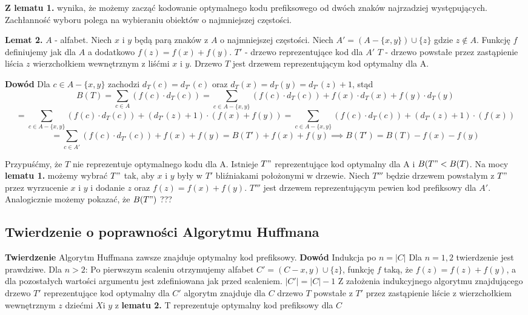 \textbf{Z lematu 1.} wynika, że możemy zacząć kodowanie optymalnego kodu prefiksowego od dwóch znaków najrzadziej występujących. Zachłanność wyboru polega na wybieraniu obiektów o najmniejszej częstości.

\textbf{Lemat 2.} $A$ - alfabet. Niech $x$ i $y$ będą parą znaków z $A$ o  najmniejszej częstości. Niech $A'= (A - \{x,y\}) \cup \{z\}$ gdzie $z \not\in A$. Funkcję $f$ definiujemy jak dla $A$ a dodatkowo $f(z) = f(x) + f(y)$.
$T'$ - drzewo reprezentujące kod dla $A'$
$T$ - drzewo powstałe przez zastąpienie liścia $z$ wierzchołkiem wewnętrznym z liśćmi $x$ i $y$.
Drzewo $T$ jest drzewem reprezentującym kod optymalny dla A.

\textbf{Dowód} Dla $c \in A - \{x,y\}$ zachodzi $d_T(c) = d_{T'}(c)$ oraz $d_T(x) = d_T(y) = d_{T'}(z)+1$, stąd 
$$B(T) = \sum_{c \in A}(f(c) \cdot d_T(c)) = \sum_{c \in A-\{x,y\}}(f(c) \cdot d_T(c)) + f(x) \cdot d_T(x) + f(y) \cdot d_T(y)$$
$$ = \sum_{c \in A-\{x,y\}}(f(c) \cdot d_T(c)) + (d_{T'}(z) +1) \cdot (f(x) + f(y)) = \sum_{c \in A-\{x,y\}}(f(c) \cdot d_T(c)) + (d_{T'}(z) +1) \cdot (f(x))$$
$$ = \sum_{c \in A'}(f(c) \cdot d_{T'}(c)) + f(x) + f(y) = B(T') + f(x) + f(y) \implies B(T') = B(T) - f(x) - f(y)$$

Przypuśćmy, że $T$ nie reprezentuje optymalnego kodu dla A. Istnieje $T"$ reprezentujące kod optymalny dla A i $B(T"  < B(T)$. Na mocy \textbf{lematu 1.} możemy wybrać $T"$ tak, aby $x$ i $y$ były w $T'$ bliźniakami położonymi w drzewie. Niech $T'''$ będzie drzewem powstałym z $T"$ przez wyrzucenie $x$ i $y$ i dodanie $z$ oraz $f(z) = f(x) + f(y)$. $T'''$ jest drzewem reprezentującym pewien kod prefiksowy dla $A'$. Analogicznie możemy pokazać, że $B(T")$ ???

\subsection{Twierdzenie o poprawności Algorytmu Huffmana}
\textbf{Twierdzenie} Algorytm Huffmana zawsze znajduje optymalny kod prefiksowy.
\textbf{Dowód} Indukcja po $n = |C|$
Dla $n = 1,2$ twierdzenie jest prawdziwe.
Dla $n > 2$:
Po pierwszym scaleniu otrzymujemy alfabet $C' = (C - {x,y}) \cup \{z\}$, funkcję $f$ taką, że $f(z) = f(z) + f(y)$, a dla pozostałych wartości argumentu jest zdefiniowana jak przed scaleniem. $|C'| = |C| -1$
Z założenia indukcyjnego algorytmu znajdującego drzewo $T'$ reprezentujące kod optymalny dla $C'$ algorytm znajduje dla $C$ drzewo $T$ powstałe z $T'$ przez zastąpienie liście z wierzchołkiem wewnętrznym $z$ dziećmi $X$i $y$ z \textbf{lematu 2.} T reprezentuje optymalny kod prefiksowy dla $C$




